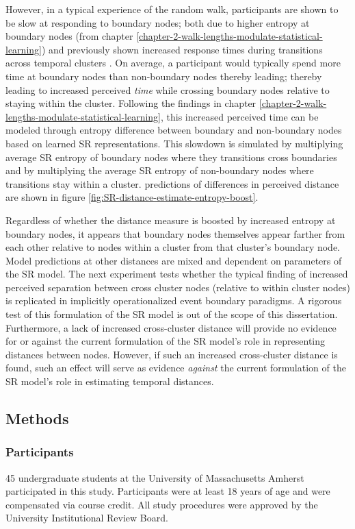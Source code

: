 However, in a typical experience of the random walk, participants are shown to be slow at responding to boundary nodes; both due to higher entropy at boundary nodes (from chapter \ref{chapter-2-walk-lengths-modulate-statistical-learning}) and previously shown increased response times during transitions across temporal clusters \cite{lynn2020abstract,kahn2018network}. On average, a participant would typically spend more time at boundary nodes than non-boundary nodes thereby leading; thereby leading to increased perceived \textit{time} while crossing boundary nodes relative to staying within the cluster. Following the findings in chapter \ref{chapter-2-walk-lengths-modulate-statistical-learning}, this increased perceived time can be modeled through entropy difference between boundary and non-boundary nodes based on learned SR representations. This slowdown is simulated by multiplying average SR entropy of boundary nodes where they transitions cross boundaries and by multiplying the average SR entropy of non-boundary nodes where transitions stay within a cluster. predictions of differences in perceived distance are shown in figure \ref{fig:SR-distance-estimate-entropy-boost}.


Regardless of whether the distance measure is boosted by increased entropy at boundary nodes, it appears that boundary nodes themselves appear farther from each other relative to nodes within a cluster from that cluster's boundary node. Model predictions at other distances are mixed and dependent on parameters of the SR model. The next experiment tests whether the typical finding of increased perceived separation between cross cluster nodes (relative to within cluster nodes) is replicated in implicitly operationalized event boundary paradigms. A rigorous test of this formulation of the SR model is out of the scope of this dissertation. Furthermore, a lack of increased cross-cluster distance will provide no evidence for or against the current formulation of the SR model's role in representing distances between nodes. However, if such an increased cross-cluster distance is found, such an effect will serve as evidence \textit{against} the current formulation of the SR model's role in estimating temporal distances. 

\subsection{Methods}
\subsubsection*{Participants}
45 undergraduate students at the University of Massachusetts Amherst participated in this study. Participants were at least 18 years of age and were compensated via course credit. All study procedures were approved by the University Institutional Review Board. 


